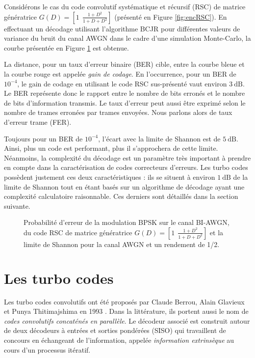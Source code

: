 Considérons le cas du code convolutif systématique et récursif (RSC) de matrice génératrice 
$G(D) = \left[ 1 ~~\frac{1+D^2}{1+D+D^2} \right]$ (présenté en Figure \ref{fig:encRSC}). 
En effectuant un décodage utilisant l'algorithme BCJR pour différentes valeurs de variance du bruit du canal AWGN dans le 
cadre d'une simulation Monte-Carlo, la courbe présentée en Figure \ref{fig:berBPSK} est obtenue. 

La distance, pour un taux d'erreur binaire (BER) cible, entre la courbe bleue et la courbe rouge est appelée \emph{gain de 
	codage}. En l'occurrence, pour un BER de $10 ^{-4}$, le gain de codage en utilisant le code RSC sus-présenté vaut
environ $3~\text{dB}$. Le BER représente donc le rapport entre le nombre de bits erronés et le nombre de bits 
d'information transmis. Le taux d'erreur peut aussi être exprimé selon le nombre de trames erronées par trames envoyées. 
Nous parlons alors de taux d'erreur trame (FER).

Toujours pour un BER de $10 ^{-4}$, l'écart avec la limite de Shannon est de $5~\text{dB}$. Ainsi, plus un code est performant, 
plus il s'approchera de cette limite. Néanmoins, la complexité du décodage est un paramètre très important à prendre en
compte dans la caractérisation de codes correcteurs d'erreurs. Les turbo codes possèdent justement ces deux caractéristiques : ils se 
situent à environ $1~\text{dB}$ de la limite de Shannon tout en étant basés sur un algorithme de décodage ayant une complexité 
calculatoire raisonnable. Ces derniers sont détaillés dans la section suivante.


\begin{figure}[!h]
	\centering
	
	\caption{\label{fig:berBPSK} Probabilité d'erreur de la modulation BPSK sur le canal BI-AWGN, du code RSC de matrice génératrice $G(D) = \left[ 1 ~~\frac{1+D^2}{1+D+D^2} \right]$ et la limite de Shannon pour la canal AWGN et un rendement de 1/2.} 
\end{figure}
		
		
\section{Les turbo codes}
Les turbo codes convolutifs ont été proposés par Claude Berrou, Alain Glavieux et Punya Thitimajshima en 1993 
\cite{berrouTC}. Dans la littérature, ils portent aussi le nom de \emph{codes convolutifs concaténés en parallèle}. 
Le décodeur associé est construit autour de deux décodeurs à entrées et sorties pondérées (SISO) qui travaillent de concours en échangeant de 
l'information, appelée \emph{information extrinsèque} au cours d'un processus itératif. 


